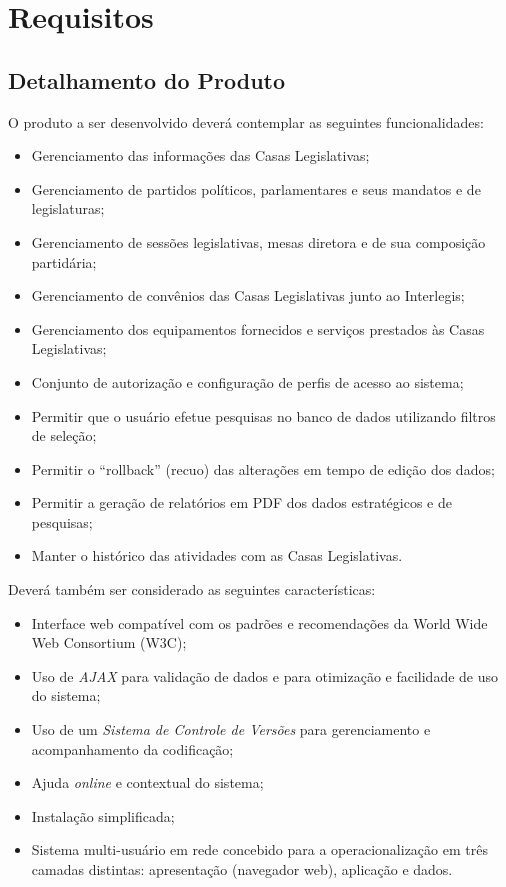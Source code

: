%
%

\section{Requisitos}
\label{sec:requisitos}

\subsection{Detalhamento do Produto}
O produto a ser desenvolvido deverá contemplar as seguintes
funcionalidades:

\begin{itemize}
\item Gerenciamento das informações das Casas Legislativas;
\item Gerenciamento de partidos políticos, parlamentares e seus
  mandatos e de legislaturas;
\item Gerenciamento de sessões legislativas, mesas diretora e de sua
  composição partidária;
\item Gerenciamento de convênios das Casas Legislativas junto ao
  Interlegis;
\item Gerenciamento dos equipamentos fornecidos e serviços prestados
  às Casas Legislativas;
\item Conjunto de autorização e configuração de perfis de acesso ao
  sistema;
\item Permitir que o usuário efetue pesquisas no banco de dados
  utilizando filtros de seleção;
\item Permitir o ``rollback'' (recuo) das alterações em tempo de
  edição dos dados;
\item Permitir a geração de relatórios em PDF dos dados estratégicos e
  de pesquisas;
\item Manter o histórico das atividades com as Casas Legislativas.
\end{itemize}

Deverá também ser considerado as seguintes características:

\begin{itemize}
\item Interface web compatível com os padrões e recomendações da World
  Wide Web Consortium (W3C);
\item Uso de \emph{AJAX} para validação de dados e para otimização e
  facilidade de uso do sistema;
\item Uso de um \emph{Sistema de Controle de Versões} para gerenciamento e
  acompanhamento da codificação;
\item Ajuda \textit{online} e contextual do sistema;
\item Instalação simplificada;
\item Sistema multi-usuário em rede concebido para a operacionalização
  em três camadas distintas: apresentação (navegador web), aplicação e
  dados.
\end{itemize}

